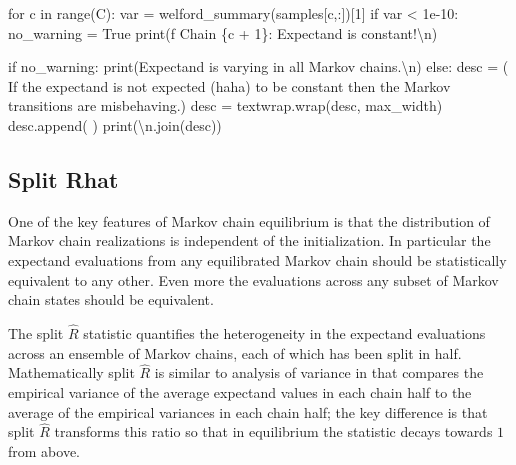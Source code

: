 \documentclass[
  letterpaper,
  DIV=11,
  numbers=noendperiod]{scrartcl}
\newenvironment{Shaded}{\begin{snugshade}}{\end{snugshade}}
\newcommand{\BuiltInTok}[1]{\textcolor[rgb]{0.00,0.23,0.31}{#1}}
\newcommand{\CharTok}[1]{\textcolor[rgb]{0.13,0.47,0.30}{#1}}
\newcommand{\ControlFlowTok}[1]{\textcolor[rgb]{0.00,0.23,0.31}{#1}}
\newcommand{\DecValTok}[1]{\textcolor[rgb]{0.68,0.00,0.00}{#1}}
\newcommand{\FloatTok}[1]{\textcolor[rgb]{0.68,0.00,0.00}{#1}}
\newcommand{\KeywordTok}[1]{\textcolor[rgb]{0.00,0.23,0.31}{#1}}
\newcommand{\NormalTok}[1]{\textcolor[rgb]{0.00,0.23,0.31}{#1}}
\newcommand{\OperatorTok}[1]{\textcolor[rgb]{0.37,0.37,0.37}{#1}}
\newcommand{\SpecialCharTok}[1]{\textcolor[rgb]{0.37,0.37,0.37}{#1}}
\newcommand{\SpecialStringTok}[1]{\textcolor[rgb]{0.13,0.47,0.30}{#1}}
\newcommand{\StringTok}[1]{\textcolor[rgb]{0.13,0.47,0.30}{#1}}
\newcommand{\VariableTok}[1]{\textcolor[rgb]{0.07,0.07,0.07}{#1}}
\begin{document}
\begin{Shaded}
\begin{Highlighting}[]
  \ControlFlowTok{for}\NormalTok{ c }\KeywordTok{in} \BuiltInTok{range}\NormalTok{(C):}
\NormalTok{    var }\OperatorTok{=}\NormalTok{ welford\_summary(samples[c,:])[}\DecValTok{1}\NormalTok{]}
    \ControlFlowTok{if}\NormalTok{ var }\OperatorTok{\textless{}} \FloatTok{1e{-}10}\NormalTok{:}
\NormalTok{      no\_warning }\OperatorTok{=} \VariableTok{True}
      \BuiltInTok{print}\NormalTok{(}\SpecialStringTok{f\textquotesingle{}  Chain }\SpecialCharTok{\{}\NormalTok{c }\OperatorTok{+} \DecValTok{1}\SpecialCharTok{\}}\SpecialStringTok{: Expectand is constant!}\CharTok{\textbackslash{}n}\SpecialStringTok{\textquotesingle{}}\NormalTok{)}

  \ControlFlowTok{if}\NormalTok{ no\_warning:}
    \BuiltInTok{print}\NormalTok{(}\StringTok{\textquotesingle{}Expectand is varying in all Markov chains.}\CharTok{\textbackslash{}n}\StringTok{\textquotesingle{}}\NormalTok{)}
  \ControlFlowTok{else}\NormalTok{:}
\NormalTok{    desc }\OperatorTok{=}\NormalTok{ (}\StringTok{\textquotesingle{}  If the expectand is not expected (haha) to be \textquotesingle{}}
            \StringTok{\textquotesingle{}constant then the Markov transitions are misbehaving.\textquotesingle{}}\NormalTok{)}
\NormalTok{    desc }\OperatorTok{=}\NormalTok{ textwrap.wrap(desc, max\_width)}
\NormalTok{    desc.append(}\StringTok{\textquotesingle{} \textquotesingle{}}\NormalTok{)}
    \BuiltInTok{print}\NormalTok{(}\StringTok{\textquotesingle{}}\CharTok{\textbackslash{}n}\StringTok{\textquotesingle{}}\NormalTok{.join(desc))}
\end{Highlighting}
\end{Shaded}

\hypertarget{split-rhat}{%
\subsection{Split Rhat}\label{split-rhat}}

One of the key features of Markov chain equilibrium is that the
distribution of Markov chain realizations is independent of the
initialization. In particular the expectand evaluations from any
equilibrated Markov chain should be statistically equivalent to any
other. Even more the evaluations across any subset of Markov chain
states should be equivalent.

The split \(\hat{R}\) statistic quantifies the heterogeneity in the
expectand evaluations across an ensemble of Markov chains, each of which
has been split in half. Mathematically split \(\hat{R}\) is similar to
analysis of variance in that compares the empirical variance of the
average expectand values in each chain half to the average of the
empirical variances in each chain half; the key difference is that split
\(\hat{R}\) transforms this ratio so that in equilibrium the statistic
decays towards \(1\) from above.
\end{document}
